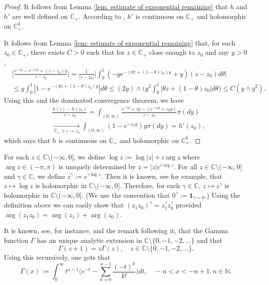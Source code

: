 \documentclass[EJP]{ejpecp} %
\begin{document}
\begin{proof}
	It follows from Lemma \ref{lem: estimate of exponential remaining} that $h$ and $h'$ are well defined on $\mathbb C_+$.
	According to \cite[Theorems 3.2. \& Proposition 3.6]{SchillingSongVondravcek2010Bernstein}, $h'$ is continuous on $\mathbb C_+$ and holomorphic on $\mathbb C_+^0$.

	It follows from Lemma \ref{lem: estimate of exponential remaining} that, for each $z_0 \in \mathbb C_+$,  there exists $C>0$ such that for $z \in \mathbb C_+$ close enough to $z_0$ and any $y>0$,
\begin{align}
    & \Big| \frac{e^{-zy} - e^{-z_0 y}+(z-z_0) y}{z-z_0} \Big|
  	= \frac{1}{|z-z_0|}\Big| \int_0^1 (-y e^{-(\theta z+(1-\theta)z_0)y}+y)(z-z_0)d\theta\Big| \\
    & \leq y\int_0^1 |1-e^{-(\theta z +(1-\theta)z_0)y}| d\theta
   	\leq (2y) \wedge\Big( y^2\int_0^1|\theta z+(1-\theta)z_0|d\theta\Big)
    \leq C(y\wedge y^2).
\end{align}
	Using this and the dominated convergence theorem, we have
\begin{align}
  	& \frac{h(z)-h(z_0)}{z-z_0} = \int_{(0,\infty)} \frac{e^{-zy}+zy -(e^{-z_0 y}+z_0 y)}{z-z_0}  \pi(dy) \\
    & \xrightarrow[\mathbb C_+\ni z\to z_0]{} \int_{(0,\infty)}(1 - e^{-z_0 y} )y\pi(dy) = h'(z_0),
\end{align}
	which says that $h$ is continuous on $\mathbb C_+$ and holomorphic on $\mathbb C_+^0$.
\end{proof}

	For each $z\in \mathbb C\setminus (-\infty,0]$, we define $ \log z := \log |z| + i \arg z$ where $\arg z \in (-\pi,\pi)$ is uniquely determined by $ z = |z|e^{i \arg z}$. 	
	For all $z\in \mathbb C\setminus (-\infty,0]$ and $\gamma \in \mathbb C$, we define $ z^\gamma := e^{\gamma \log z}. $
	Then it is known, see \cite[Theorem 6.1]{SteinShakarchi2003Complex} for example, that $z\mapsto \log z$ is holomorphic in $\mathbb C\setminus (-\infty,0]$.
	Therefore, for each $\gamma \in \mathbb C$, $z\mapsto z^\gamma$ is holomorphic in $\mathbb C\setminus (-\infty,0]$. (We use the convention that  $0^\gamma := \mathbf 1_{\gamma = 0}$.)
	Using the definition above we can easily show that $(z_1z_0)^\gamma = z_1^\gamma z_0^\gamma$ provided $\arg (z_1z_0)=\arg (z_1) + \arg(z_0)$.

	It is known, see, for instance, \cite[Theorem 6.1.3]{SteinShakarchi2003Complex} and the remark following it, that the Gamma function $\Gamma$ has an unique analytic extension in $\mathbb C\setminus\{0, -1,-2,\dots\}$ and that
\[
	\Gamma(z+1)
	= z \Gamma(z),\quad z\in \mathbb C\setminus\{0, -1,-2,\dots\}.
\]
	Using this recursively, one gets that
\[
  	\label{eq: definition of Gamma function}
  	\Gamma(x)
  	:= \int_0^\infty t^{x-1} \Big(e^{-t} - \sum_{k=0}^{n-1} \frac{(-t)^k}{k!}\Big) dt,
  	\quad -n< x< -n+1, n\in \mathbb N.
\]
\end{document}
